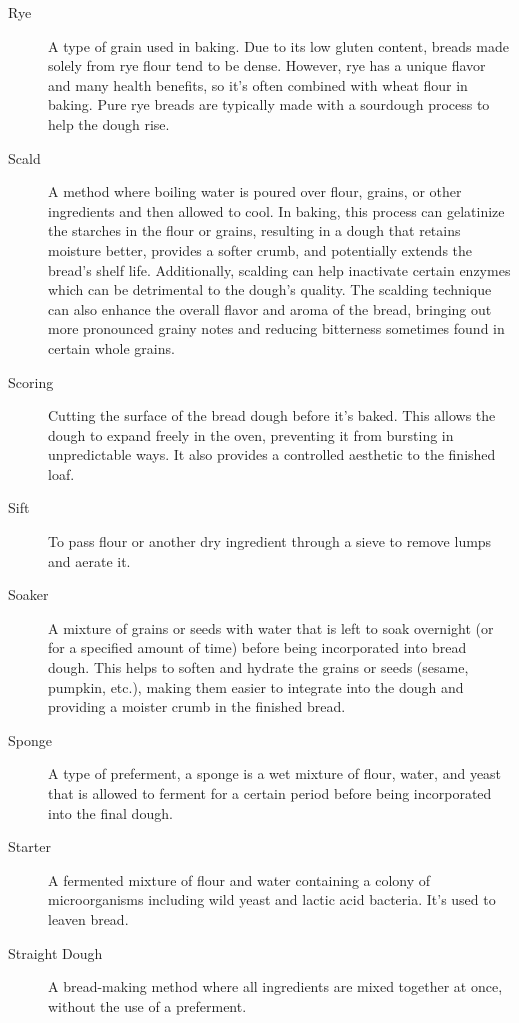 \begin{description}
\item[Rye] A type of grain used in baking. Due to its low gluten content, breads
made solely from rye flour tend to be dense. However, rye has a unique flavor and
many health benefits, so it's often combined with wheat flour in baking. Pure rye
breads are typically made with a sourdough process to help the dough rise.

\item[Scald] A method where boiling water is poured over flour, grains, or other
ingredients and then allowed to cool. In baking, this process can gelatinize the
starches in the flour or grains, resulting in a dough that retains moisture better,
provides a softer crumb, and potentially extends the bread's shelf life. Additionally,
scalding can help inactivate certain enzymes which can be detrimental to the dough's
quality. The scalding technique can also enhance the overall flavor and aroma of
the bread, bringing out more pronounced grainy notes and reducing bitterness
sometimes found in certain whole grains.

\item[Scoring] Cutting the surface of the bread dough before it's baked. This
allows the dough to expand freely in the oven, preventing it from bursting in
unpredictable ways. It also provides a controlled aesthetic to the finished loaf.

\item[Sift] To pass flour or another dry ingredient through a sieve to
    remove lumps and aerate it.

\item[Soaker] A mixture of grains or seeds with water that is left to soak overnight (or for a
specified amount of time) before being incorporated into bread dough. This helps to
soften and hydrate the grains or seeds (sesame, pumpkin, etc.), making them
easier to integrate into the dough and
providing a moister crumb in the finished bread.

\item[Sponge] A type of preferment, a sponge is a wet mixture of flour, water, and
yeast that is allowed to ferment for a certain period before being incorporated into
the final dough.

\item[Starter] A fermented mixture of flour and water containing a colony of
microorganisms including wild yeast and lactic acid bacteria. It's used to leaven
bread.

\item[Straight Dough] A bread-making method where all ingredients are mixed
together at once, without the use of a preferment.


\end{description}
